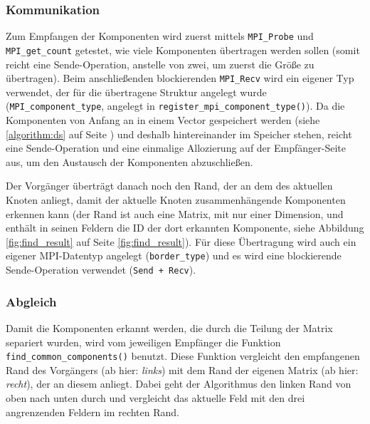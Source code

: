 \subsubsection{Kommunikation}

Zum Empfangen der Komponenten wird zuerst mittels \verb+MPI_Probe+ und \verb+MPI_get_count+ getestet, wie viele Komponenten übertragen werden sollen (somit reicht eine Sende-Operation, anstelle von zwei, um zuerst die Größe zu übertragen). Beim anschließenden blockierenden \verb+MPI_Recv+ wird ein eigener Typ verwendet, der für die übertragene Struktur angelegt wurde (\verb+MPI_component_type+, angelegt in \verb+register_mpi_component_type()+). Da die Komponenten von Anfang an in einem Vector gespeichert werden (siehe \ref{algorithm:ds} auf Seite \pageref{algorithm:ds}) und deshalb hintereinander im Speicher stehen, reicht eine Sende-Operation und eine einmalige Allozierung auf der Empfänger-Seite aus, um den Austausch der Komponenten abzuschließen.

Der Vorgänger überträgt danach noch den Rand, der an dem des aktuellen Knoten anliegt, damit der aktuelle Knoten zusammenhängende Komponenten erkennen kann (der Rand ist auch eine Matrix, mit nur einer Dimension, und enthält in seinen Feldern die ID der dort erkannten Komponente, siehe Abbildung \ref{fig:find_result} auf Seite \ref{fig:find_result}). Für diese Übertragung wird auch ein eigener MPI-Datentyp angelegt (\verb+border_type+) und es wird eine blockierende Sende-Operation verwendet (\verb$Send + Recv$).

\subsubsection{Abgleich}

Damit die Komponenten erkannt werden, die durch die Teilung der Matrix separiert wurden, wird vom jeweiligen Empfänger die Funktion \verb+find_common_components()+ benutzt. Diese Funktion vergleicht den empfangenen Rand des Vorgängers (ab hier: \textit{links}) mit dem Rand der eigenen Matrix (ab hier: \textit{recht}), der an diesem anliegt. Dabei geht der Algorithmus den linken Rand von oben nach unten durch und vergleicht das aktuelle Feld mit den drei angrenzenden Feldern im rechten Rand.

